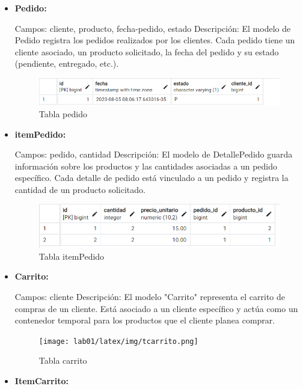 \documentclass{article}
\begin{document}
\begin{itemize}
		\item \textbf{Pedido:}
		
		Campos: cliente, producto, fecha-pedido, estado
		Descripción: El modelo de Pedido registra los pedidos realizados por los clientes. Cada pedido tiene un cliente asociado, un producto solicitado, la fecha del pedido y su estado (pendiente, entregado, etc.).
		\begin{figure}[h!]
			\centering
			\includegraphics[width=1\linewidth]{img/tpedido}
			\caption{Tabla pedido}
			\label{fig:tpedido}
		\end{figure}
		
	
		\item \textbf{itemPedido:}
	
	Campos: pedido, cantidad
	Descripción: El modelo de DetallePedido guarda información sobre los productos y las cantidades asociadas a un pedido específico. Cada detalle de pedido está vinculado a un pedido y registra la cantidad de un producto solicitado.
	\begin{figure}[h!]
		\centering
		\includegraphics[width=1\linewidth]{img/titempedido}
		\caption{Tabla itemPedido}
		\label{fig:titempedido}
	\end{figure}
	
		\item \textbf{Carrito:}
		
	Campos: cliente
	Descripción: El modelo "Carrito" representa el carrito de compras de un cliente. Está asociado a un cliente específico y actúa como un contenedor temporal para los productos que el cliente planea comprar.
	\begin{figure}[h!]
		\centering
        
		\texttt{[image: lab01/latex/img/tcarrito.png]}
		\caption{Tabla carrito}
		\label{fig:tcarrito}
	\end{figure}

        \newpage
		\item \textbf{ItemCarrito:}
		

\end{itemize}
\end{document}
